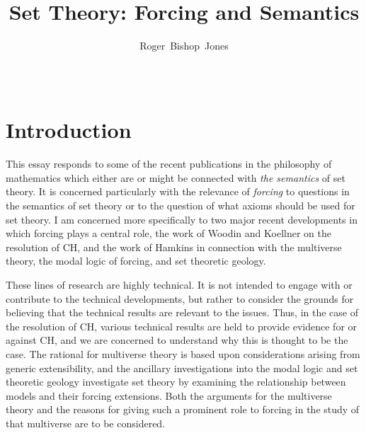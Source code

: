 \documentclass[10pt,titlepage]{article}
\title{Set Theory: Forcing and Semantics}
\author{Roger~Bishop~Jones}
\date{\ }
\newcommand{\ignore}[1]{}
\begin{document}
                               
\begin{titlepage}
\maketitle

\ignore{
\vfill

\begin{abstract}

\end{abstract}

\begin{centering}

{\footnotesize

\copyright\ Roger~Bishop~Jones;
}%

\end{centering}
}%

\end{titlepage}

\setcounter{tocdepth}{2}
{\parskip-0pt\tableofcontents}




\section{Introduction}

This essay responds to some of the recent publications in the philosophy of mathematics which either are or might be connected with \emph{the semantics} of set theory.
It is concerned particularly with the relevance of \emph{forcing} to questions in the semantics of set theory or to the question of what axioms should be used for set theory.
I am concerned more specifically to two major recent developments in which forcing plays a central role, the work of Woodin and Koellner on the resolution of CH, and the work of Hamkins in connection with the multiverse theory, the modal logic of forcing, and set theoretic geology.

These lines of research are highly technical.
It is not intended to engage with or contribute to the technical developments, but rather to consider the grounds for believing that the technical results are relevant to the issues.
Thus, in the case of the resolution of CH, various technical results are held to provide evidence for or against CH, and we are concerned to understand why this is thought to be the case.
The rational for multiverse theory is based upon considerations arising from generic extensibility, and the ancillary investigations into the modal logic and set theoretic geology investigate set theory by examining the relationship between models and their forcing extensions.
Both the arguments for the multiverse theory and the reasons for giving such a prominent role to forcing in the study of that multiverse are to be considered.
\end{document}
